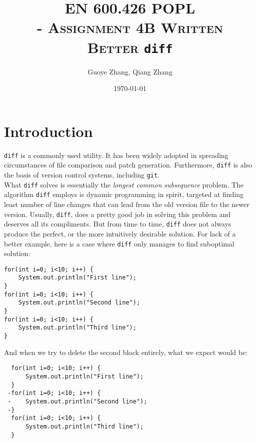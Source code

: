 \documentclass{article}
\begin{document}
\title{\textsc{EN 600.426 POPL \\ - Assignment 4B Written}\\ \textbf{\textsc{Better } \texttt{diff}}} %
\author{Guoye Zhang, Qiang Zhang\\
        }  %
\date{\today}  %
\maketitle

\section{Introduction}
\texttt{diff} is a commonly used utility. It has been widely adopted in spreading circumstances of file comparison and patch generation. Furthermore, \texttt{diff} is also the basis of version control systems, including \texttt{git}.\\

What \texttt{diff} solves is essentially the \textit{longest common subsequence} problem. The algorithm \texttt{diff} employs is dynamic programming in spirit, targeted at finding least number of line changes that can lead from the old version file to the newer version. Usually, \texttt{diff}, does a pretty good job  in solving this problem and deserves all its compliments. But from time to time, \texttt{diff} does not always produce the perfect, or the more intuitively desirable solution. For lack of a better example, here is a case where \texttt{diff} only manages to find suboptimal solution:\\
\begin{lstlisting}
for(int i=0; i<10; i++) {
    System.out.println("First line");
}
for(int i=0; i<10; i++) {
    System.out.println("Second line");
}
for(int i=0; i<10; i++) {
    System.out.println("Third line");
}
\end{lstlisting}

And when we try to delete the second block entirely, what we expect would be:
\begin{lstlisting}
  for(int i=0; i<10; i++) {
      System.out.println("First line");
  }
 -for(int i=0; i<10; i++) {
 -    System.out.println("Second line");
 -}
  for(int i=0; i<10; i++) {
      System.out.println("Third line");
  }
\end{lstlisting}
\end{document}
